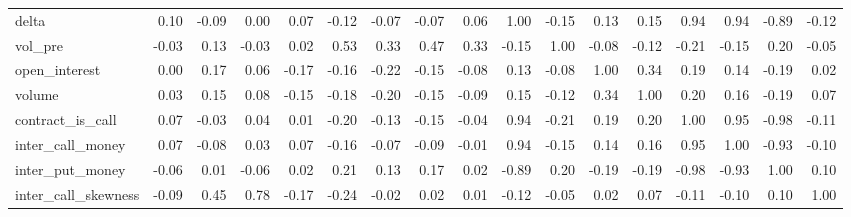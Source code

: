 \begin{tabular}{lrrrrrrrrrrrrrrrr}
delta               &     0.10 &       -0.09 &      0.00 &      0.07 &   -0.12 &         -0.07 &       -0.07 &  0.06 &   1.00 &    -0.15 &           0.13 &    0.15 &              0.94 &              0.94 &            -0.89 &                -0.12 \\
vol\_pre             &    -0.03 &        0.13 &     -0.03 &      0.02 &    0.53 &          0.33 &        0.47 &  0.33 &  -0.15 &     1.00 &          -0.08 &   -0.12 &             -0.21 &             -0.15 &             0.20 &                -0.05 \\
open\_interest       &     0.00 &        0.17 &      0.06 &     -0.17 &   -0.16 &         -0.22 &       -0.15 & -0.08 &   0.13 &    -0.08 &           1.00 &    0.34 &              0.19 &              0.14 &            -0.19 &                 0.02 \\
volume              &     0.03 &        0.15 &      0.08 &     -0.15 &   -0.18 &         -0.20 &       -0.15 & -0.09 &   0.15 &    -0.12 &           0.34 &    1.00 &              0.20 &              0.16 &            -0.19 &                 0.07 \\
contract\_is\_call    &     0.07 &       -0.03 &      0.04 &      0.01 &   -0.20 &         -0.13 &       -0.15 & -0.04 &   0.94 &    -0.21 &           0.19 &    0.20 &              1.00 &              0.95 &            -0.98 &                -0.11 \\
inter\_call\_money    &     0.07 &       -0.08 &      0.03 &      0.07 &   -0.16 &         -0.07 &       -0.09 & -0.01 &   0.94 &    -0.15 &           0.14 &    0.16 &              0.95 &              1.00 &            -0.93 &                -0.10 \\
inter\_put\_money     &    -0.06 &        0.01 &     -0.06 &      0.02 &    0.21 &          0.13 &        0.17 &  0.02 &  -0.89 &     0.20 &          -0.19 &   -0.19 &             -0.98 &             -0.93 &             1.00 &                 0.10 \\
inter\_call\_skewness &    -0.09 &        0.45 &      0.78 &     -0.17 &   -0.24 &         -0.02 &        0.02 &  0.01 &  -0.12 &    -0.05 &           0.02 &    0.07 &             -0.11 &             -0.10 &             0.10 &                 1.00 \\
\bottomrule
\end{tabular}

